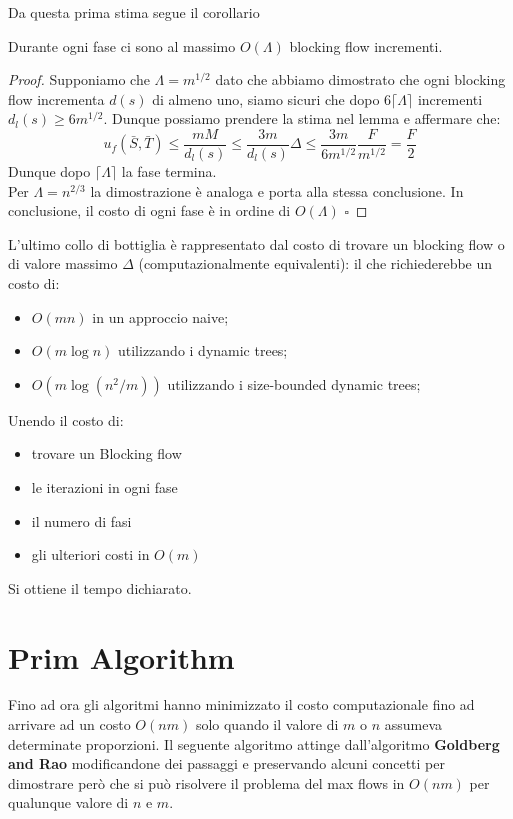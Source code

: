 \documentclass[a4paper, 11pt]{report}
\newcommand*{\QED}{\null\nobreak\hfill\ensuremath{\square}}%
\begin{document}
    Da questa prima stima segue il corollario
    \begin{corollary}{}{}
    Durante ogni fase ci sono al massimo $O(\Lambda)$ blocking flow incrementi.
    \end{corollary}
    \begin{proof}
        Supponiamo che $\Lambda = m^{1/2}$ dato che abbiamo dimostrato che ogni blocking flow incrementa $d(s)$ di almeno uno, siamo sicuri che dopo $6\lceil \Lambda\rceil$ incrementi $d_l(s) \ge 6 m^{1/2}$.
        Dunque possiamo prendere la stima nel lemma e affermare che:
        \[ u_f(\bar{S}, \bar{T})\le \frac{mM}{d_l(s)}\le \frac{3m}{d_l(s)}\Delta\le \frac{3m}{6m^{1/2}}\frac{F}{m^{1/2}} = \frac{F}{2}\]
        Dunque dopo $\lceil \Lambda\rceil$ la fase termina.\\
        Per $\Lambda = n^{2/3}$ la dimostrazione è analoga e porta alla stessa conclusione. 
        In conclusione, il costo di ogni fase è in ordine di $O(\Lambda)$ \QED
    \end{proof}
    
    L'ultimo collo di bottiglia è rappresentato dal costo di trovare un blocking flow o di valore massimo $\Delta$ (computazionalmente equivalenti):
    il che richiederebbe un costo di:
    \begin{itemize}
        \item $O(mn)$ in un approccio naive;
        \item $O(m\log n)$ utilizzando i dynamic trees;
        \item $O(m \log(n^2/m))$ utilizzando i size-bounded dynamic trees;
    \end{itemize}
    Unendo il costo di:
    \begin{itemize}[label=$\times$]
        \item trovare un Blocking flow
        \item le iterazioni in ogni fase
        \item il numero di fasi
        \item gli ulteriori costi in $O(m)$
    \end{itemize}
    Si ottiene il tempo dichiarato.











    \chapter{Prim Algorithm}
Fino ad ora gli algoritmi hanno minimizzato il costo computazionale fino ad arrivare ad un costo $O(nm)$ solo quando il valore di $m$ o $n$ assumeva determinate proporzioni.
Il seguente algoritmo attinge dall'algoritmo \textbf{Goldberg and Rao} modificandone dei passaggi e preservando alcuni concetti per dimostrare però che si può risolvere il problema del max flows in $O(nm)$ per qualunque valore di $n$ e $m$.
\end{document}
